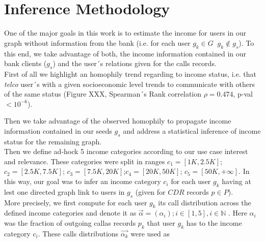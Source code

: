 \section{Inference Methodology}






One of the major goals in this work is to estimate the income for users in our graph without information from the bank (i.e. for each user $g_k \in G $ $\ g_k \notin g_s$). To this end, we take advantage of both, the income information contained in our bank clients ($g_s$) and the user´s relations given for the calls records. \\

First of all we highlight an homophily trend regarding to income status, i.e. that \textit{telco} user´s with a given socioeconomic level trends to communicate with others of the same status (Figure XXX, Spearman´s Rank correlation $\rho= 0.474$, p-val$<10^{-6}$). 

Then we take advantage of the observed homophily to propagate income information contained in our seeds $g_s$ and address a statistical inference of income status for the remaining graph. \\

Then we define ad-hock 5 income categories according to our use case interest and relevance. These categories were split in ranges $c_1=[1K,2.5K]$; $c_2=[2.5K,7.5K]$; $c_3=[7.5K,20K]$;$c_4=[20K,50K]$; $c_5=[50K,+ \infty]$.  In this way, our goal was to infer an income category $c_i$ for each user $g_k$ having at lest one directed graph link to users in $g_s$ (given for $CDR$ records  $p\in P$).\\

More precisely, we first compute for each user $g_k$ its call distribution  across the defined income categories and denote it as $\vec{\alpha} =(\alpha_i); i \in [1,5], i\in \mathbb{N}$ . Here $\alpha_i$ was the fraction of outgoing callas records $p_k$ that user $g_k$ has to the income category $c_i$. These calls distributions $\vec{\alpha_k}$ were used as  


